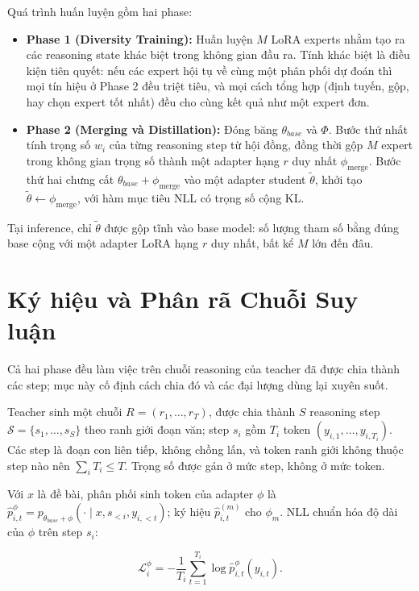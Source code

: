 \documentclass[12pt,a4paper]{article}
\newcommand{\pmerge}{\phi_{\mathrm{merge}}}
\begin{document}
Quá trình huấn luyện gồm hai phase:

\begin{itemize}
\item \textbf{Phase 1 (Diversity Training):} Huấn luyện $M$ LoRA experts nhằm tạo ra các reasoning state khác biệt trong không gian đầu ra. Tính khác biệt là điều kiện tiên quyết: nếu các expert hội tụ về cùng một phân phối dự đoán thì mọi tín hiệu ở Phase 2 đều triệt tiêu, và mọi cách tổng hợp (định tuyến, gộp, hay chọn expert tốt nhất) đều cho cùng kết quả như một expert đơn.
\item \textbf{Phase 2 (Merging và Distillation):} Đóng băng $\theta_{base}$ và $\Phi$. Bước thứ nhất tính trọng số $w_i$ của từng reasoning step từ hội đồng, đồng thời gộp $M$ expert trong không gian trọng số thành một adapter hạng $r$ duy nhất $\pmerge$. Bước thứ hai chưng cất $\theta_{base}+\pmerge$ vào một adapter student $\tilde\theta$, khởi tạo $\tilde\theta \leftarrow \pmerge$, với hàm mục tiêu NLL có trọng số cộng KL.
\end{itemize}

Tại inference, chỉ $\tilde\theta$ được gộp tĩnh vào base model: số lượng tham số bằng đúng base cộng với một adapter LoRA hạng $r$ duy nhất, bất kể $M$ lớn đến đâu.

\section{Ký hiệu và Phân rã Chuỗi Suy luận}
\label{sec:notation}

Cả hai phase đều làm việc trên chuỗi reasoning của teacher đã được chia thành các step; mục này cố định cách chia đó và các đại lượng dùng lại xuyên suốt.

Teacher sinh một chuỗi $R = (r_1, \dots, r_T)$, được chia thành $S$ reasoning step $\mathcal{S} = \{s_1, \dots, s_S\}$ theo ranh giới đoạn văn; step $s_i$ gồm $T_i$ token $(y_{i,1}, \dots, y_{i,T_i})$. Các step là đoạn con liên tiếp, không chồng lấn, và token ranh giới không thuộc step nào nên $\sum_i T_i \le T$. Trọng số được gán ở mức step, không ở mức token.

Với $x$ là đề bài, phân phối sinh token của adapter $\phi$ là $\hat p_{i,t}^{\phi} = p_{\theta_{base}+\phi}(\cdot \mid x, s_{<i}, y_{i,<t})$; ký hiệu $\hat p_{i,t}^{(m)}$ cho $\phi_m$. NLL chuẩn hóa độ dài của $\phi$ trên step $s_i$:

\begin{equation}
\label{eq:nll}
\mathcal{L}_i^{\phi}
=
-\frac{1}{T_i}\sum_{t=1}^{T_i}
\log \hat p_{i,t}^{\phi}(y_{i,t}).
\end{equation}
\end{document}
